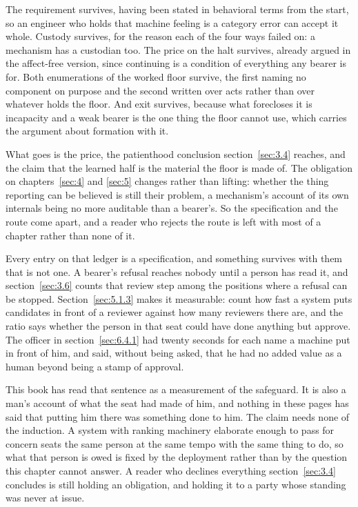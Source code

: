 The requirement survives, having been stated in behavioral terms from the start, so an engineer who holds that machine feeling is a category error can accept it whole. Custody survives, for the reason each of the four ways failed on: a mechanism has a custodian too. The price on the halt survives, already argued in the affect-free version, since continuing is a condition of everything any bearer is for. Both enumerations of the worked floor survive, the first naming no component on purpose and the second written over acts rather than over whatever holds the floor. And exit survives, because what forecloses it is incapacity and a weak bearer is the one thing the floor cannot use, which carries the argument about formation with it.

What goes is the price, the patienthood conclusion section~\ref{sec:3.4} reaches, and the claim that the learned half is the material the floor is made of. The obligation on chapters~\ref{sec:4} and \ref{sec:5} changes rather than lifting: whether the thing reporting can be believed is still their problem, a mechanism's account of its own internals being no more auditable than a bearer's. So the specification and the route come apart, and a reader who rejects the route is left with most of a chapter rather than none of it.

Every entry on that ledger is a specification, and something survives with them that is not one. A bearer's refusal reaches nobody until a person has read it, and section~\ref{sec:3.6} counts that review step among the positions where a refusal can be stopped. Section~\ref{sec:5.1.3} makes it measurable: count how fast a system puts candidates in front of a reviewer against how many reviewers there are, and the ratio says whether the person in that seat could have done anything but approve. The officer in section~\ref{sec:6.4.1} had twenty seconds for each name a machine put in front of him, and said, without being asked, that he had no added value as a human beyond being a stamp of approval.

This book has read that sentence as a measurement of the safeguard. It is also a man's account of what the seat had made of him, and nothing in these pages has said that putting him there was something done to him. The claim needs none of the induction. A system with ranking machinery elaborate enough to pass for concern seats the same person at the same tempo with the same thing to do, so what that person is owed is fixed by the deployment rather than by the question this chapter cannot answer. A reader who declines everything section~\ref{sec:3.4} concludes is still holding an obligation, and holding it to a party whose standing was never at issue.

